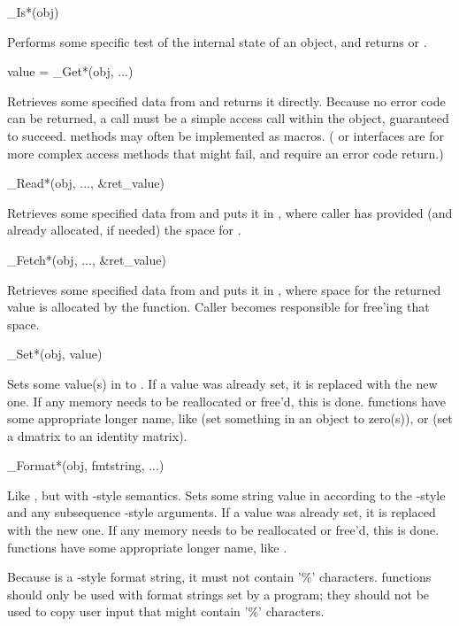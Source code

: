 \begin{sreapi}

\hypertarget{ifc:Is}
{\item[\_Is*(obj)]}

Performs some specific test of the internal state of an
object, and returns  or .

\hypertarget{ifc:Get}
{\item[value = \_Get*(obj, ...)]}

Retrieves some specified data from  and returns it
directly. Because no error code can be returned, a 
call must be a simple access call within the object, guaranteed to
succeed.  methods may often be implemented as macros.
( or  interfaces are for more complex
access methods that might fail, and require an error code return.)

\hypertarget{ifc:Read}
{\item[\_Read*(obj, ..., \&ret\_value)]}

Retrieves some specified data from  and puts it in
, where caller has provided (and already allocated,
if needed) the space for .

\hypertarget{ifc:Fetch}
{\item[\_Fetch*(obj, ..., \&ret\_value)]}

Retrieves some specified data from  and puts it in
, where space for the returned value is allocated by
the function. Caller becomes responsible for free'ing that space.

\hypertarget{ifc:Set}
{\item[\_Set*(obj, value)]}

Sets some value(s) in  to . If a value was
already set, it is replaced with the new one. If any memory needs to
be reallocated or free'd, this is done.  functions have
some appropriate longer name, like  (set something
in an object to zero(s)), or  (set
a dmatrix to an identity matrix).

\hypertarget{ifc:Format}
{\item[\_Format*(obj, fmtstring, ...)]}

Like , but with -style semantics.  Sets
some string value in  according to the
-style  and any subsequence
-style arguments. If a value was already set, it is
replaced with the new one. If any memory needs to be reallocated or
free'd, this is done.   functions have some
appropriate longer name, like
.

Because  is a -style format string,
it must not contain '\%' characters.  functions
should only be used with format strings set by a program; they should
not be used to copy user input that might contain '\%' characters.
\end{sreapi}


